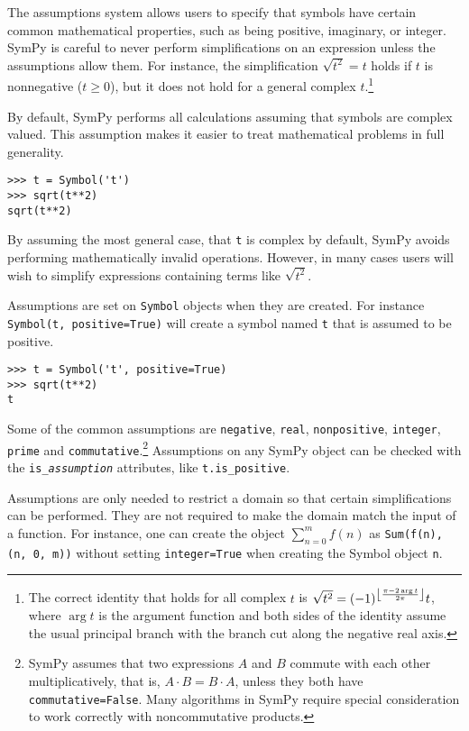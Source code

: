 The assumptions system allows users to specify that symbols have certain
common mathematical properties, such as being positive, imaginary, or
integer. SymPy is careful to never perform simplifications on an expression
unless the assumptions allow them. For instance, the simplification $\sqrt{t^2}
= t$ holds if $t$ is nonnegative ($t\ge 0$), but it does not hold for a general
complex $t$.\footnote{%
The correct identity that holds for all complex $t$ is
$\sqrt{t^2} = (-1)^{\left\lfloor \pi-2\arg t \over 2\pi \right\rfloor} t$,
where $\arg t$ is the argument function and both sides of the identity assume
the usual principal branch with the branch cut along the negative real axis.}

By default, SymPy performs all calculations assuming that symbols are
complex valued. This assumption makes it easier to treat mathematical problems
in full generality.
\begin{verbatim}
>>> t = Symbol('t')
>>> sqrt(t**2)
sqrt(t**2)
\end{verbatim}

By assuming the most general case, that \texttt{t} is complex by default, SymPy
avoids performing mathematically invalid operations. However, in many cases
users will wish to simplify expressions containing terms like $\sqrt{t^2}$.

Assumptions are set on \texttt{Symbol} objects when they are created. For
instance \texttt{Symbol(\textquotesingle{}t\textquotesingle{}, positive=True)} will create a symbol named
\texttt{t} that is assumed to be positive.
\begin{verbatim}
>>> t = Symbol('t', positive=True)
>>> sqrt(t**2)
t
\end{verbatim}

Some of the common assumptions are
\texttt{negative}, \texttt{real}, \texttt{nonpositive}, \texttt{integer},
\texttt{prime} and \texttt{commutative}.\footnote{SymPy assumes that two
  expressions $A$ and $B$ commute with each other multiplicatively, that is,
  $A\cdot B=B\cdot A$, unless they both have \texttt{commutative=False}. Many
  algorithms in SymPy require special consideration to work correctly with
  noncommutative products.} Assumptions on any SymPy object can be checked with the
\verb|is_|\texttt{\textit{assumption}} attributes, like \verb|t.is_positive|.

Assumptions are only needed to restrict a domain so that certain
simplifications can be performed. They are not required to make the domain match
the input of a function. For instance, one can create the object
$\sum_{n=0}^m f(n)$ as \verb|Sum(f(n), (n, 0, m))| without setting
\texttt{integer=True} when creating the Symbol object \texttt{n}.

